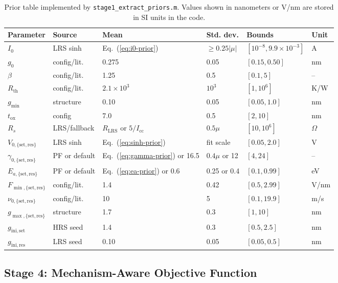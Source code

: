 \documentclass[journal]{IEEEtran}
\begin{document}
\begin{table}[!t]
\centering
\caption{Prior table implemented by \texttt{stage1\_extract\_priors.m}.
Values shown in nanometers or V/nm are stored in SI units in the code.}
\label{tab:priors}
\footnotesize
\begin{tabular}{@{}llllll@{}}
\toprule
Parameter & Source & Mean & Std. dev. & Bounds & Unit\\
\midrule
$I_0$ & LRS sinh & Eq.~(\ref{eq:i0-prior}) & $\ge 0.25|\mu|$ & $[10^{-8},9.9{\times}10^{-3}]$ & A\\
$g_0$ & config/lit. & 0.275 & 0.05 & $[0.15,0.50]$ & nm\\
$\beta$ & config/lit. & 1.25 & 0.5 & $[0.1,5]$ & --\\
$R_{\mathrm{th}}$ & config/lit. & $2.1{\times}10^3$ & $10^3$ & $[1,10^6]$ & K/W\\
$g_{\min}$ & structure & 0.10 & 0.05 & $[0.05,1.0]$ & nm\\
$t_{\mathrm{ox}}$ & config & 7.0 & 0.5 & $[2,10]$ & nm\\
$R_s$ & LRS/fallback & $R_{\mathrm{LRS}}$ or $5/I_{\mathrm{cc}}$ & $0.5\mu$ & $[10,10^6]$ & $\Omega$\\
$V_{0,\{\mathrm{set,res}\}}$ & LRS sinh & Eq.~(\ref{eq:sinh-prior}) & fit scale & $[0.05,2.0]$ & V\\
$\gamma_{0,\{\mathrm{set,res}\}}$ & PF or default & Eq.~(\ref{eq:gamma-prior}) or 16.5 & $0.4\mu$ or 12 & $[4,24]$ & --\\
$E_{a,\{\mathrm{set,res}\}}$ & PF or default & Eq.~(\ref{eq:ea-prior}) or 0.6 & 0.25 or 0.4 & $[0.1,0.99]$ & eV\\
$F_{\min,\{\mathrm{set,res}\}}$ & config/lit. & 1.4 & 0.42 & $[0.5,2.99]$ & V/nm\\
$\nu_{0,\{\mathrm{set,res}\}}$ & config/lit. & 10 & 5 & $[0.1,19.9]$ & m/s\\
$g_{\max,\{\mathrm{set,res}\}}$ & structure & 1.7 & 0.3 & $[1,10]$ & nm\\
$g_{\mathrm{ini,set}}$ & HRS seed & 1.4 & 0.3 & $[0.5,2.5]$ & nm\\
$g_{\mathrm{ini,res}}$ & LRS seed & 0.10 & 0.05 & $[0.05,0.5]$ & nm\\
\bottomrule
\end{tabular}
\end{table}

\subsection{Stage 4: Mechanism-Aware Objective Function}
\label{sec:loss}
\end{document}
